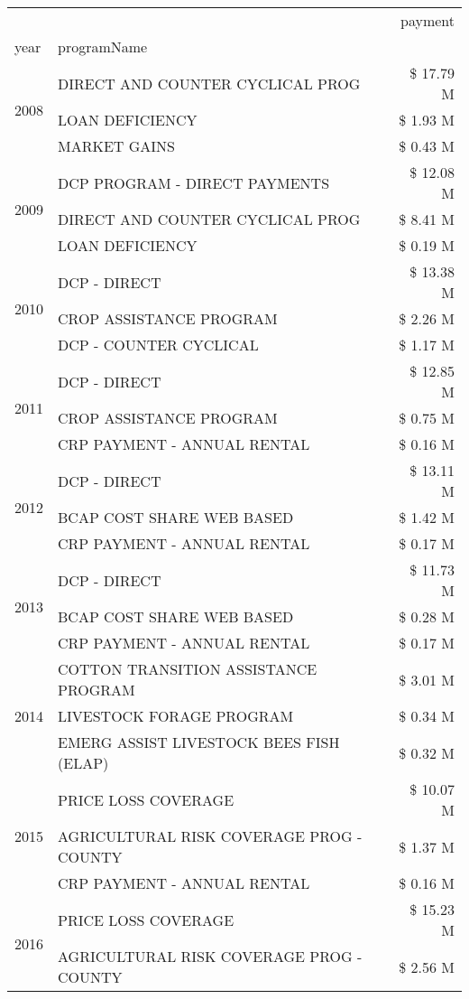 \begin{tabular}{llr}
\toprule
 &  & payment \\
year & programName &  \\
\midrule
\multirow[t]{3}{*}{2008} & DIRECT AND COUNTER CYCLICAL PROG & \$ 17.79 M \\
 & LOAN DEFICIENCY & \$ 1.93 M \\
 & MARKET GAINS & \$ 0.43 M \\
\cline{1-3}
\multirow[t]{3}{*}{2009} & DCP PROGRAM - DIRECT PAYMENTS & \$ 12.08 M \\
 & DIRECT AND COUNTER CYCLICAL PROG & \$ 8.41 M \\
 & LOAN DEFICIENCY & \$ 0.19 M \\
\cline{1-3}
\multirow[t]{3}{*}{2010} & DCP - DIRECT & \$ 13.38 M \\
 & CROP ASSISTANCE PROGRAM & \$ 2.26 M \\
 & DCP - COUNTER CYCLICAL & \$ 1.17 M \\
\cline{1-3}
\multirow[t]{3}{*}{2011} & DCP - DIRECT & \$ 12.85 M \\
 & CROP ASSISTANCE PROGRAM & \$ 0.75 M \\
 & CRP PAYMENT - ANNUAL RENTAL & \$ 0.16 M \\
\cline{1-3}
\multirow[t]{3}{*}{2012} & DCP - DIRECT & \$ 13.11 M \\
 & BCAP COST SHARE WEB BASED & \$ 1.42 M \\
 & CRP PAYMENT - ANNUAL RENTAL & \$ 0.17 M \\
\cline{1-3}
\multirow[t]{3}{*}{2013} & DCP - DIRECT & \$ 11.73 M \\
 & BCAP COST SHARE WEB BASED & \$ 0.28 M \\
 & CRP PAYMENT - ANNUAL RENTAL & \$ 0.17 M \\
\cline{1-3}
\multirow[t]{3}{*}{2014} & COTTON TRANSITION ASSISTANCE PROGRAM & \$ 3.01 M \\
 & LIVESTOCK FORAGE PROGRAM & \$ 0.34 M \\
 & EMERG ASSIST LIVESTOCK BEES FISH (ELAP) & \$ 0.32 M \\
\cline{1-3}
\multirow[t]{3}{*}{2015} & PRICE LOSS COVERAGE & \$ 10.07 M \\
 & AGRICULTURAL RISK COVERAGE PROG - COUNTY & \$ 1.37 M \\
 & CRP PAYMENT - ANNUAL RENTAL & \$ 0.16 M \\
\cline{1-3}
\multirow[t]{3}{*}{2016} & PRICE LOSS COVERAGE & \$ 15.23 M \\
 & AGRICULTURAL RISK COVERAGE PROG - COUNTY & \$ 2.56 M \\

\end{tabular}
